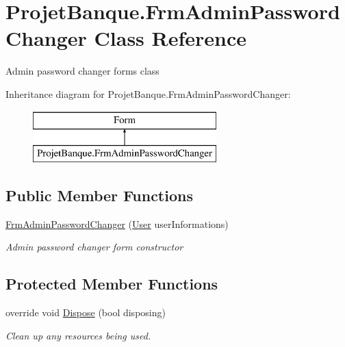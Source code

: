 \hypertarget{class_projet_banque_1_1_frm_admin_password_changer}{}\section{Projet\+Banque.\+Frm\+Admin\+Password\+Changer Class Reference}
\label{class_projet_banque_1_1_frm_admin_password_changer}


Admin password changer form\textquotesingle{}s class  


Inheritance diagram for Projet\+Banque.\+Frm\+Admin\+Password\+Changer\+:\begin{figure}[H]
\begin{center}
\leavevmode
\includegraphics[height=2.000000cm]{class_projet_banque_1_1_frm_admin_password_changer}
\end{center}
\end{figure}
\subsection*{Public Member Functions}
\begin{DoxyCompactItemize}
\item 
\mbox{\hyperlink{class_projet_banque_1_1_frm_admin_password_changer_a64ece1dfd49ad952ce43521f025256bf}{Frm\+Admin\+Password\+Changer}} (\mbox{\hyperlink{class_projet_banque_1_1_user}{User}} user\+Informations)
\begin{DoxyCompactList}\small\item\em Admin password changer form constructor \end{DoxyCompactList}\end{DoxyCompactItemize}
\subsection*{Protected Member Functions}
\begin{DoxyCompactItemize}
\item 
override void \mbox{\hyperlink{class_projet_banque_1_1_frm_admin_password_changer_aabfbbd95a43e94586d993ac2def275ea}{Dispose}} (bool disposing)
\begin{DoxyCompactList}\small\item\em Clean up any resources being used. \end{DoxyCompactList}\end{DoxyCompactItemize}


